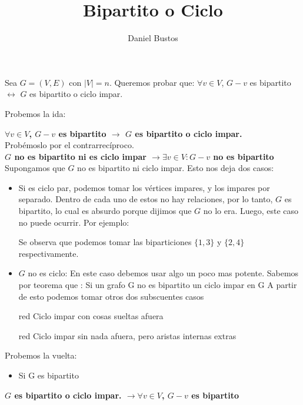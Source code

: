 \documentclass{article}
\title{Bipartito o Ciclo}
\author{Daniel Bustos}
\begin{document}
\maketitle

Sea $G = (V,E)$ con $|V| = n$. Queremos probar que: $\forall v \in V$, $G-v$ es bipartito $\leftrightarrow$ $G$ es bipartito o ciclo impar.

Probemos la ida:

\textbf{$\forall v \in V$, $G-v$ es bipartito $\rightarrow$ $G$ es bipartito o ciclo impar.}\\

Probémoslo por el contrarrecíproco.\\
\textbf{$G$  no es bipartito ni es ciclo impar $\rightarrow \exists v \in V: G-v $ no es bipartito}
Supongamos que $G$ no es bipartito ni ciclo impar. Esto nos deja dos casos:
\begin{itemize}


\item Si es ciclo par, podemos tomar los vértices impares, y los impares por separado. Dentro de cada uno de estos no hay relaciones, por lo tanto, $G$ es bipartito, lo cual es absurdo porque dijimos que $G$ no lo era. Luego, este caso no puede ocurrir. Por ejemplo:

\begin{center}
\end{center}

Se observa que podemos tomar las biparticiones $\{1,3\}$ y $\{2,4\}$ respectivamente.

\item $G$ no es ciclo: En este caso debemos usar algo un poco mas potente. Sabemos por teorema que : Si un grafo G no es bipartito  \leftrightarrow \exists un ciclo impar en G
A partir de esto podemos tomar otros dos subscuentes casos
\item[red] Ciclo impar con cosas sueltas afuera
\item[red] Ciclo impar sin nada afuera, pero aristas internas extras


\end{itemize}
Probemos la vuelta: 
\begin{itemize}

	\item Si G es bipartito

\end{itemize}

\textbf{$G$ es bipartito o ciclo impar. $\rightarrow \forall v \in V$, $G-v$ es bipartito} 
\end{document}
